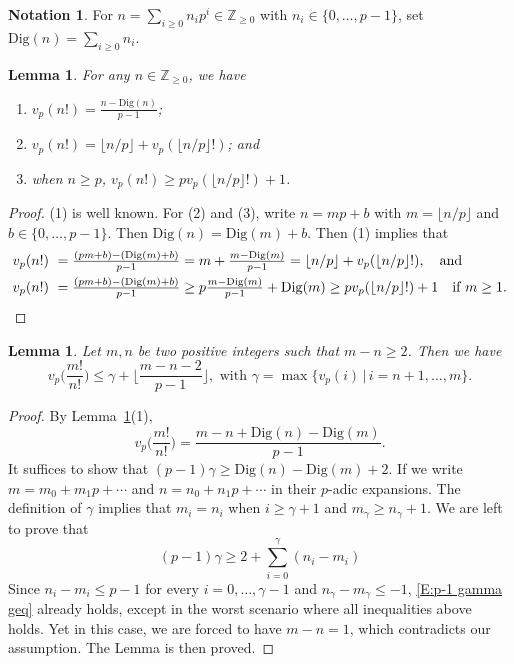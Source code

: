 \documentclass[12pt]{amsart}
\newtheorem{lemma}[subsection]{Lemma}
\theoremstyle{definition}
\newtheorem{notation}[subsection]{Notation}
\numberwithin{equation}{subsection}
\def\ZZ{\mathbb{Z}}
\newcommand{\Dig}{\mathrm{Dig}}
\begin{document}
\begin{notation}
	For $n=\sum\limits_{i\geq 0}n_ip^i\in\ZZ_{ \geq 0}$ with $n_i\in \{0,\dots,p-1 \}$, set $\Dig(n)=\sum\limits_{i\geq 0}n_i$. 
\end{notation}

\begin{lemma}
\label{L:p-adic valuation of n!}
For any $n \in \ZZ_{\geq 0}$, we have
\begin{enumerate}
\item $v_p(n!)=\frac{n-\Dig(n)}{p-1}$;
\item $v_p(n!)=\lfloor n/p\rfloor+v_p(\lfloor n/p\rfloor! )$; and
\item when $n \geq p$, $v_p(n!)\geq pv_p(\lfloor n/p\rfloor! )+1$.
\end{enumerate}
\end{lemma}
\begin{proof}
(1) is well known. For (2) and (3), write $n = mp + b$ with $m = \lfloor n/p\rfloor$ and $b \in \{0, \dots, p-1\}$. Then $\Dig(n) = \Dig(m)+b$. Then (1) implies that
\begin{align*}
v_p(n!) \ &= \tfrac{(pm+b)-(\Dig(m)+b)}{p-1} = m+\tfrac{m-\Dig(m)}{p-1} = \lfloor n/p\rfloor+v_p(\lfloor n/p\rfloor! ), \quad \textrm{and}
\\
v_p(n!) \ &= \tfrac{(pm+b)-(\Dig(m)+b)}{p-1} \geq p \tfrac{m-\Dig(m)}{p-1} + \Dig(m) \geq pv_p(\lfloor n/p\rfloor! ) + 1 \quad \textrm{if }m \geq 1. \qedhere
\end{align*}
\end{proof}


\begin{lemma}\label{L:p-adic valuation of m!/n! is bounded by maximal valuation of integers between n+1 and m and some number involving m,n}
Let $m,n$ be two positive integers such that $m-n\geq 2$. Then we have 
	\[
	v_p\Big(\frac{m!}{n!} \Big)\leq \gamma+\Big\lfloor \frac{m-n-2}{p-1} \Big\rfloor , \text{~with~}\gamma=\max\{v_p(i)\,|\,i=n+1,\dots, m \}.
	\]
\end{lemma}
\begin{proof}
By Lemma~\ref{L:p-adic valuation of n!}(1),
$$
v_p\Big(\frac{m!}{n!} \Big) = \frac{m - n + \Dig(n) - \Dig(m)}{p-1}.
$$
It suffices to show that $(p-1)\gamma \geq \Dig(n) - \Dig(m) +2$. If we write $m = m_0+m_1p+\cdots$ and $n = n_0+n_1p+\cdots$ in their $p$-adic expansions. The definition of $\gamma$ implies that $m_i = n_i$ when $i \geq \gamma+1$ and $m_\gamma \geq n_\gamma+1$. We are left to prove that 
\begin{equation}
\label{E:p-1 gamma geq}
(p-1)\gamma \geq 2+ \sum\limits_{i=0}^{\gamma} (n_i-m_i)
\end{equation}
Since $n_i-m_i \leq p-1$ for every $i =0, \dots, \gamma-1$ and $n_\gamma -m_\gamma \leq -1$, \eqref{E:p-1 gamma geq} already holds, except in the worst scenario where all inequalities above holds. Yet in this case, we are forced to have $m - n = 1$, which contradicts our assumption. The Lemma is then proved.
\end{proof}
\end{document}
